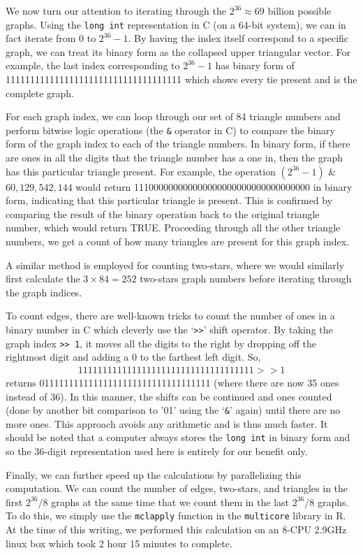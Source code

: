We now turn our attention to iterating through the $2^{36} \approx 69$ billion possible graphs.  
Using the \texttt{long int} representation in C (on a 64-bit system), 
we can in fact iterate from 0 to $2^{36}-1$.  By having the index itself 
correspond to a specific graph,  we can treat its binary form as 
the collapsed upper triangular vector.
For example, the last index corresponding to $2^{36}-1$ has binary form of 
 111111111111111111111111111111111111 which shows every tie present and
 is the complete graph.
   
For each graph index, we can loop through our set of 84 triangle numbers
and perform bitwise logic operations (the \texttt{\&} operator in C) to 
compare the binary form of the graph index to each of the triangle numbers.  
In binary form, if there are ones in all the digits that the triangle number has a 
one in, 
then the graph has this particular triangle present.
For example, the operation $(2^{36}-1)$ \& $60,129,542,144$ would return 
111000000000000000000000000000000000 in binary form, indicating that this 
particular triangle is present.  This is confirmed by comparing the
result of the binary operation back to the original triangle number,
which would return TRUE.  Proceeding through all the other triangle numbers, 
we get a count of how many triangles are present for this graph index.

A similar method is employed for counting two-stars, where we would similarly
first calculate the $3\times84 = 252$ two-stars graph numbers before iterating
through the graph indices.

To count edges, there are well-known tricks to count the number of ones 
in a binary number in C which cleverly use the `\texttt{>>}' shift operator.
By taking the graph index \texttt{>> 1}, it moves all the digits to the 
right by dropping off the rightmost digit and adding a 0 to the 
farthest left digit.  So, 
\begin{align*}
111111111111111111111111111111111111 >> 1
\end{align*}
returns 01111111111111111111111111111111111 (where there are now 35 ones instead of 36).  
In this manner, the shifts can be continued and ones counted 
(done by another bit comparison to '01' using the `\texttt{\&}' again) 
until there are no more ones.  This approach avoids any arithmetic and is thus much faster.  
It should be noted that a computer always stores the \texttt{long int} in binary form 
and so the 36-digit representation used here is entirely for our benefit only.

Finally, we can further speed up the calculations by parallelizing this computation.  
We can count the number of edges, two-stars, and triangles in the 
first $2^{36}/8$ graphs at the same time that we count them in the last $2^{36}/8$ graphs.  
To do this, we simply use the \texttt{mclapply} function in the \texttt{multicore} \citep{multicore:R} 
library in R.
At the time of this writing, we performed this calculation on an 8-CPU 2.9GHz linux box
which took 2 hour 15 minutes to complete.  




